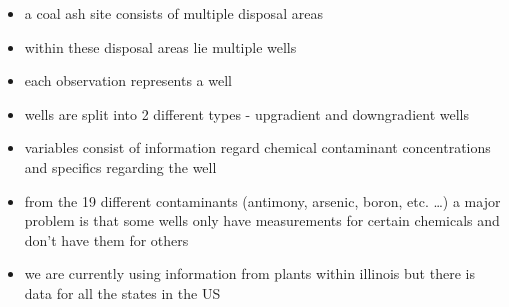 \documentclass[
]{article}
\begin{document}
\begin{itemize}
\item
  a coal ash site consists of multiple disposal areas
\item
  within these disposal areas lie multiple wells
\item
  each observation represents a well
\item
  wells are split into 2 different types - upgradient and downgradient
  wells
\item
  variables consist of information regard chemical contaminant
  concentrations and specifics regarding the well
\item
  from the 19 different contaminants (antimony, arsenic, boron, etc.
  \ldots) a major problem is that some wells only have measurements for
  certain chemicals and don't have them for others
\item
  we are currently using information from plants within illinois but
  there is data for all the states in the US
\end{itemize}
\end{document}
